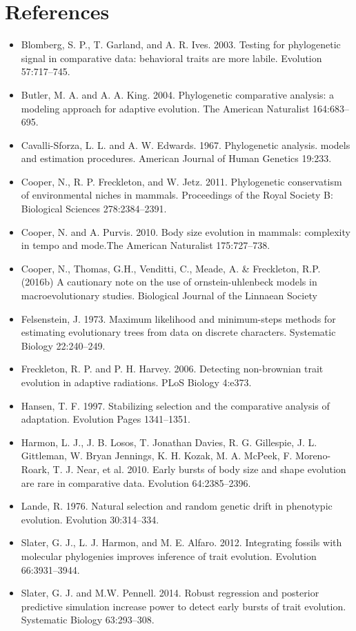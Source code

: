 \documentclass[]{book}
\providecommand{\tightlist}{%
  \setlength{\itemsep}{0pt}\setlength{\parskip}{0pt}}
\theoremstyle{definition}
\theoremstyle{definition}
\theoremstyle{definition}
\theoremstyle{remark}
\begin{document}
\section{References}\label{references-3}

\begin{itemize}
\tightlist
\item
  Blomberg, S. P., T. Garland, and A. R. Ives. 2003. Testing for
  phylogenetic signal in comparative data: behavioral traits are more
  labile. Evolution 57:717--745.
\item
  Butler, M. A. and A. A. King. 2004. Phylogenetic comparative analysis:
  a modeling approach for adaptive evolution. The American Naturalist
  164:683--695.
\item
  Cavalli-Sforza, L. L. and A. W. Edwards. 1967. Phylogenetic analysis.
  models and estimation procedures. American Journal of Human Genetics
  19:233.
\item
  Cooper, N., R. P. Freckleton, and W. Jetz. 2011. Phylogenetic
  conservatism of environmental niches in mammals. Proceedings of the
  Royal Society B: Biological Sciences 278:2384--2391.
\item
  Cooper, N. and A. Purvis. 2010. Body size evolution in mammals:
  complexity in tempo and mode.The American Naturalist 175:727--738.
\item
  Cooper, N., Thomas, G.H., Venditti, C., Meade, A. \& Freckleton, R.P.
  (2016b) A cautionary note on the use of ornstein-uhlenbeck models in
  macroevolutionary studies. Biological Journal of the Linnaean Society
\item
  Felsenstein, J. 1973. Maximum likelihood and minimum-steps methods for
  estimating evolutionary trees from data on discrete characters.
  Systematic Biology 22:240--249.
\item
  Freckleton, R. P. and P. H. Harvey. 2006. Detecting non-brownian trait
  evolution in adaptive radiations. PLoS Biology 4:e373.
\item
  Hansen, T. F. 1997. Stabilizing selection and the comparative analysis
  of adaptation. Evolution Pages 1341--1351.
\item
  Harmon, L. J., J. B. Losos, T. Jonathan Davies, R. G. Gillespie, J. L.
  Gittleman, W. Bryan Jennings, K. H. Kozak, M. A. McPeek, F.
  Moreno-Roark, T. J. Near, et al. 2010. Early bursts of body size and
  shape evolution are rare in comparative data. Evolution 64:2385--2396.
\item
  Lande, R. 1976. Natural selection and random genetic drift in
  phenotypic evolution. Evolution 30:314--334.
\item
  Slater, G. J., L. J. Harmon, and M. E. Alfaro. 2012. Integrating
  fossils with molecular phylogenies improves inference of trait
  evolution. Evolution 66:3931--3944.
\item
  Slater, G. J. and M.W. Pennell. 2014. Robust regression and posterior
  predictive simulation increase power to detect early bursts of trait
  evolution. Systematic Biology 63:293--308.
\end{itemize}
\end{document}
